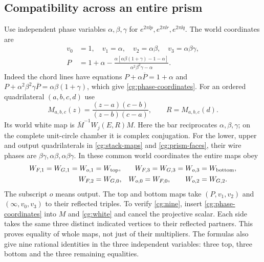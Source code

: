 \subsection{Compatibility across an entire prism}
Use independent phase variables $\alpha,\beta,\gamma$ for
$e^{2\pi\ii p},e^{2\pi\ii r},e^{2\pi\ii q}$.
The world coordinates are
\begin{equation}\label{cg:phase-coordinates}
\begin{split}
 v_0&=1,\quad v_1=\alpha,\quad
 v_2=\alpha\beta,\quad v_3=\alpha\beta\gamma,\\
 P&=1+\alpha-
 \frac{\alpha[\alpha\beta(1+\gamma)-1-\alpha]}
             {\alpha^2\beta^2\gamma-\alpha}.
\end{split}
\end{equation}
Indeed the chord lines have equations
$P+\alpha\overline P=1+\alpha$ and
$P+\alpha^2\beta^2\gamma\overline P=\alpha\beta(1+\gamma)$,
which give \eqref{cg:phase-coordinates}.
For an ordered quadrilateral $(a,b,c,d)$ use
\[
 M_{a,b,c}(z)=\frac{(z-a)(c-b)}{(z-b)(c-a)},\qquad
 R=M_{a,b,c}(d).
\]
Its world white map is $\overline M^{-1}W_j(E,R)M$.
Here the bar reciprocates $\alpha,\beta,\gamma$; on the complete
unit-circle chamber it is complex conjugation.
For the lower, upper and output quadrilaterals in
\eqref{cg:stack-maps} and \eqref{cg:prism-faces}, their wire
phases are $\beta\gamma,\alpha\beta,\alpha\beta\gamma$.
In these common world coordinates the entire maps obey
\begin{equation}\label{cg:nine}
\begin{aligned}
 W_{F,1}=W_{G,1}=W_{o,1}&=W_{\rm top},&
 W_{F,3}=W_{G,3}=W_{o,3}&=W_{\rm bottom},\\
 W_{F,2}&=W_{G,0},&
 W_{o,0}=W_{F,0},\qquad W_{o,2}&=W_{G,2}.
\end{aligned}
\end{equation}
The subscript $o$ means output. The top and bottom maps take
$(P,v_1,v_2)$ and $(\infty,v_0,v_3)$ to their reflected triples.
To verify \eqref{cg:nine}, insert \eqref{cg:phase-coordinates}
into $M$ and \eqref{cg:white} and cancel the projective scalar.
Each side takes the same three distinct indicated vertices to
their reflected partners. This proves equality of whole maps,
not just of their multipliers. The formulas also give nine
rational identities in the three independent variables: three
top, three bottom and the three remaining equalities.

